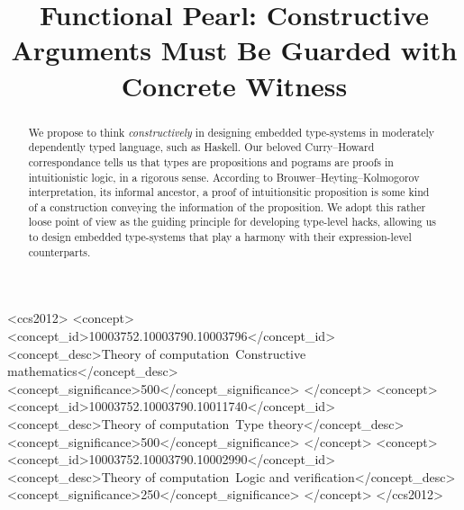 \documentclass[acmsmall]{acmart}
\begin{document}
\title[Functional Pearl: Constructive Arguments]{Functional Pearl: Constructive Arguments Must Be Guarded with Concrete Witness}



\begin{abstract}
  
\end{abstract}

\begin{CCSXML}
<ccs2012>
   <concept>
       <concept_id>10003752.10003790.10003796</concept_id>
       <concept_desc>Theory of computation~Constructive mathematics</concept_desc>
       <concept_significance>500</concept_significance>
       </concept>
   <concept>
       <concept_id>10003752.10003790.10011740</concept_id>
       <concept_desc>Theory of computation~Type theory</concept_desc>
       <concept_significance>500</concept_significance>
       </concept>
   <concept>
       <concept_id>10003752.10003790.10002990</concept_id>
       <concept_desc>Theory of computation~Logic and verification</concept_desc>
       <concept_significance>250</concept_significance>
       </concept>
 </ccs2012>
\end{CCSXML}




\begin{abstract}
  We propose to think \emph{constructively} in designing embedded type-systems in moderately dependently typed language, such as Haskell.
  Our beloved Curry--Howard correspondance tells us that types are propositions and pograms are proofs in intuitionistic logic, in a rigorous sense.
  According to Brouwer--Heyting--Kolmogorov interpretation, its informal ancestor, a proof of intuitionsitic proposition is some kind of a construction conveying the information of the proposition.
  We adopt this rather loose point of view as the guiding principle for developing type-level hacks, allowing us to design embedded type-systems that play a harmony with their expression-level counterparts.
\end{abstract}
\end{document}
